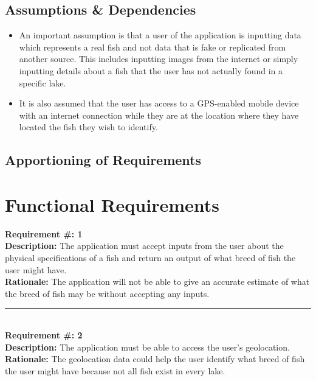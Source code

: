 \documentclass{article}
\begin{document}
\subsection{Assumptions \& Dependencies}
\begin{itemize}
	\item
	An important assumption is that a user of the application is inputting data which represents a real fish and not data that is fake or replicated from another source. This includes inputting images from the internet or simply inputting details about a fish that the user has not actually found in a specific lake.

	\item
	It is also assumed that the user has access to a GPS-enabled mobile device with an internet connection while they are at the location where they have located the fish they wish to identify.
\end{itemize}

\subsection{Apportioning of Requirements}

\iffalse
Have not determined yet whether there are requirements that we be delayed until the future.
\fi

\section{Functional Requirements}
	\textbf{Requirement \#: 1}\\
	\textbf{Description:} The application must accept inputs from the user about the physical specifications of a fish and return an output of what breed of fish the user might have.\\
	\textbf{Rationale: } The application will not be able to give an accurate estimate of what the breed of fish may be without accepting any inputs.

	\noindent\rule{12cm}{0.4pt} \\

	\noindent\textbf{Requirement \#: 2}\\
	\textbf{Description:} The application must be able to access the user's geolocation.\\
	\textbf{Rationale:} The geolocation data could help the user identify what breed of fish the user might have because not all fish exist in every lake.\\
\end{document}
